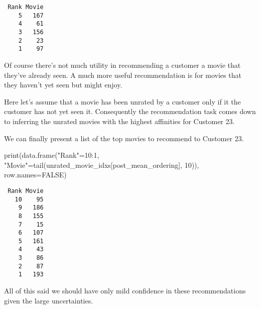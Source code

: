 \documentclass[
  letterpaper,
  DIV=11,
  numbers=noendperiod]{scrartcl}
\newenvironment{Shaded}{\begin{snugshade}}{\end{snugshade}}
\newcommand{\AttributeTok}[1]{\textcolor[rgb]{0.40,0.45,0.13}{#1}}
\newcommand{\ConstantTok}[1]{\textcolor[rgb]{0.56,0.35,0.01}{#1}}
\newcommand{\ControlFlowTok}[1]{\textcolor[rgb]{0.00,0.23,0.31}{#1}}
\newcommand{\DecValTok}[1]{\textcolor[rgb]{0.68,0.00,0.00}{#1}}
\newcommand{\FunctionTok}[1]{\textcolor[rgb]{0.28,0.35,0.67}{#1}}
\newcommand{\NormalTok}[1]{\textcolor[rgb]{0.00,0.23,0.31}{#1}}
\newcommand{\OtherTok}[1]{\textcolor[rgb]{0.00,0.23,0.31}{#1}}
\newcommand{\SpecialCharTok}[1]{\textcolor[rgb]{0.37,0.37,0.37}{#1}}
\newcommand{\StringTok}[1]{\textcolor[rgb]{0.13,0.47,0.30}{#1}}
\begin{document}
\begin{verbatim}
 Rank Movie
    5   167
    4    61
    3   156
    2    23
    1    97
\end{verbatim}

Of course there's not much utility in recommending a customer a movie
that they've already seen. A much more useful recommendation is for
movies that they haven't yet seen but might enjoy.

Here let's assume that a movie has been unrated by a customer only if it
the customer has not yet seen it. Consequently the recommendation task
comes down to inferring the unrated movies with the highest affinities
for Customer 23.

\begin{Shaded}
\end{Shaded}

We can finally present a list of the top movies to recommend to Customer
23.

\begin{Shaded}
\begin{Highlighting}[]
\FunctionTok{print}\NormalTok{(}\FunctionTok{data.frame}\NormalTok{(}\StringTok{"Rank"}\OtherTok{=}\DecValTok{10}\SpecialCharTok{:}\DecValTok{1}\NormalTok{,}
                 \StringTok{"Movie"}\OtherTok{=}\FunctionTok{tail}\NormalTok{(unrated\_movie\_idxs[post\_mean\_ordering], }\DecValTok{10}\NormalTok{)),}
      \AttributeTok{row.names=}\ConstantTok{FALSE}\NormalTok{)}
\end{Highlighting}
\end{Shaded}

\begin{verbatim}
 Rank Movie
   10    95
    9   186
    8   155
    7    15
    6   107
    5   161
    4    43
    3    86
    2    87
    1   193
\end{verbatim}

All of this said we should have only mild confidence in these
recommendations given the large uncertainties.
\end{document}
